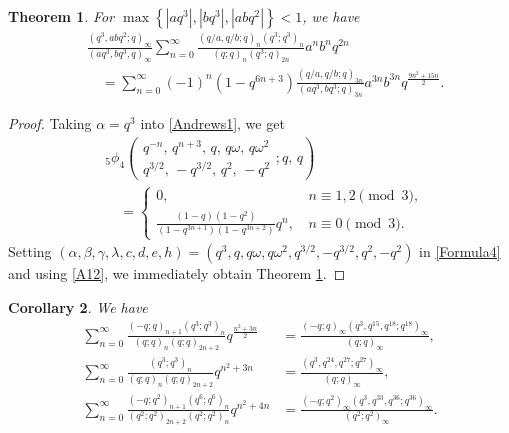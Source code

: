 \documentclass[reqno,12pt]{amsart}
\newtheorem{theorem}{Theorem}[section]%
\newtheorem{corollary}[theorem]{Corollary}
\theoremstyle{remark}
\numberwithin{equation}{section}
\begin{document}
\begin{theorem}\label{T1}
For $\max\left\{|aq^3|,|bq^3|,|abq^2|\right\}<1$, we have
\begin{align*}
&\frac{\left(q^3,abq^2;q\right)_{\infty}}{\left(aq^3,bq^3,q\right)_{\infty}}
\sum_{n=0}^{\infty}
\frac{\left(q/a,q/b;q\right)_n\left(q^3;q^3\right)_n}
{\left(q;q\right)_n\left(q^3;q\right)_{2n}}a^nb^nq^{2n}\\
&\quad=
\sum_{n=0}^{\infty}\left(-1\right)^n\left(1-q^{6n+3}\right)
\frac{\left(q/a,q/b;q\right)_{3n}}{\left(aq^3,bq^3;q\right)_{3n}}a^{3n}b^{3n}
q^{\frac{9n^2+15n}{2}}.
\end{align*}
\end{theorem}
\begin{proof}
Taking $\alpha=q^3$ into \eqref{Andrews1}, we get
\begin{align}
&{_5\phi_4}\left(\begin{array}{ccccc}
q^{-n},\,q^{n+3},\,q,\,q\omega,\,q\omega^2\\
q^{3/2},\,-q^{3/2},\,q^2,\,-q^2
\end{array};q,\,q
\right)\nonumber\\
&\quad=\left\{
\begin{array}{ll}
0,\,&n\equiv1,2\pmod3,\\
\frac{\left(1-q\right)\left(1-q^2\right)}
{\left(1-q^{3n+1}\right)\left(1-q^{3n+2}\right)}q^n,\, &n\equiv0\pmod3.
\end{array}
\right.\label{A12}
\end{align}
Setting $\left(\alpha,\beta,\gamma,\lambda,c,d,e,h\right)
=\left(q^3,q,q\omega,q\omega^2,q^{3/2},-q^{3/2},q^2,-q^2\right)$ in \eqref{Formula4} and using \eqref{A12}, we immediately obtain Theorem \ref{T1}.
\end{proof}
\begin{corollary}
We have
\begin{align}
\sum_{n=0}^{\infty}\frac{\left(-q;q\right)_{n+1}\left(q^3;q^3\right)_{n}}
{\left(q;q\right)_n\left(q;q\right)_{2n+2}}q^{\frac{n^2+3n}{2}}
&=\frac{\left(-q;q\right)_{\infty}\left(q^{3},q^{15},q^{18};q^{18}\right)_{\infty}}{\left(q;q\right)_{\infty}}
,\tag{S.76}\label{S.76}
\\
\sum_{n=0}^{\infty}\frac{\left(q^3;q^3\right)_{n}}
{\left(q;q\right)_n\left(q;q\right)_{2n+2}}q^{n^2+3n}
&=\frac{\left(q^{3},q^{24},q^{27};q^{27}\right)_{\infty}}{\left(q;q\right)_{\infty}}
,\tag{S.90}\label{S.90}
\\
\sum_{n=0}^{\infty}\frac{\left(-q;q^2\right)_{n+1}
\left(q^6;q^6\right)_n}
{\left(q^2;q^2\right)_{2n+2}\left(q^2;q^2\right)_n}q^{n^2+4n}
&=\frac{\left(-q;q^2\right)_{\infty}\left(q^3,q^{33},q^{36};q^{36}\right)_{\infty}}
{\left(q^2;q^2\right)_{\infty}}.\tag{S.116}\label{S.116}
\end{align}
\end{corollary}
\end{document}
